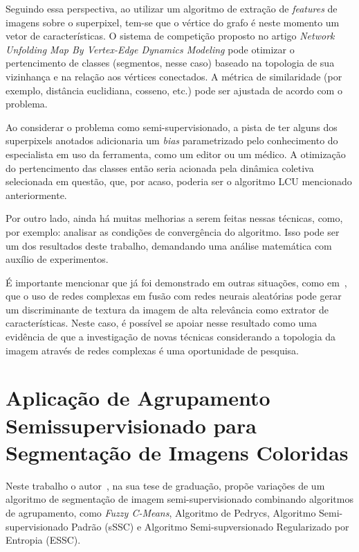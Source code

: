Seguindo essa perspectiva, ao utilizar um algoritmo de extração de
\textit{features} de imagens sobre o superpixel, tem-se que o vértice
do grafo é neste momento um vetor de características. O sistema de
competição proposto no artigo \textit{Network Unfolding Map By
Vertex-Edge Dynamics Modeling} pode otimizar o pertencimento de
classes (segmentos, nesse caso) baseado na topologia de sua vizinhança
e na relação aos vértices conectados. A métrica de similaridade
(por exemplo, distância euclidiana, cosseno, etc.) pode ser
ajustada de acordo com o problema.

Ao considerar o problema como semi-supervisionado, a pista de ter
alguns dos superpixels anotados adicionaria um \textit{bias}
parametrizado pelo conhecimento do especialista em uso da ferramenta,
como um editor ou um médico. A otimização do pertencimento das classes
então seria acionada pela dinâmica coletiva selecionada em questão,
que, por acaso, poderia ser o algoritmo \gls{LCU} mencionado anteriormente.

Por outro lado, ainda há muitas melhorias a serem feitas nessas técnicas, como,
por exemplo: analisar as condições de convergência do algoritmo. Isso
pode ser um dos resultados deste trabalho, demandando uma análise
matemática com auxílio de experimentos.

É importante mencionar que já foi demonstrado em outras situações,
como em~\cite{JarbasComplexNetworks2020}, que o uso de redes complexas
em fusão com redes neurais aleatórias pode gerar um discriminante de
textura da imagem de alta relevância como extrator de
características. Neste caso, é possível se apoiar nesse resultado como
uma evidência de que a investigação de novas técnicas considerando a
topologia da imagem através de redes complexas é uma oportunidade de
pesquisa.


\section{Aplicação de Agrupamento Semissupervisionado para Segmentação
  de Imagens Coloridas}\label{sec:franciscolira2018}

Neste trabalho o autor~\cite{franciscolira2018}, na sua tese de
graduação, propõe variações de um algoritmo de segmentação de imagem
semi-supervisionado combinando algoritmos de agrupamento, como
\textit{Fuzzy C-Means}, Algoritmo de Pedrycs, Algoritmo
Semi-supervisionado Padrão (sSSC) e Algoritmo Semi-supversionado
Regularizado por Entropia (ESSC).


